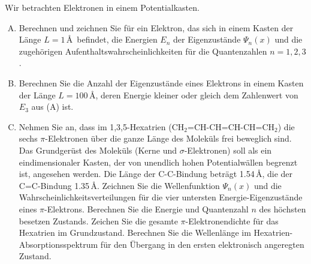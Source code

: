 \documentclass[11pt,a4paper]{article}
\begin{document}





\begin{aufg}
Wir betrachten Elektronen in einem Potentialkasten.
\begin{enumerate}[(A)]
 \item Berechnen und zeichnen Sie für ein Elektron, das sich in einem Kasten der Länge
$L=1$\,\AA\ befindet, die Energien $E_n$ der Eigenzustände $\Psi_n(x)$ und
die zugehörigen Aufenthaltswahrscheinlichkeiten für die Quantenzahlen $n=1,2,3$.
 \item Berechnen Sie die Anzahl der Eigenzustände eines Elektrons in einem Kasten der
 Länge $L=100$\,\AA, deren Energie kleiner oder gleich dem Zahlenwert von $E_3$ aus (A) ist.
 \item Nehmen Sie an, dass im 1,3,5-Hexatrien (CH$_2$=CH-CH=CH-CH=CH$_2$) die sechs
 $\pi$-Elektronen über die ganze Länge des Moleküls frei beweglich sind. Das Grundgerüst des Moleküls
 (Kerne und $\sigma$-Elektronen) soll als ein eindimensionaler Kasten, der von unendlich
 hohen Potentialwällen begrenzt ist, angesehen werden. Die Länge der C-C-Bindung
 beträgt 1.54\,\AA, die der C=C-Bindung 1.35\,\AA. Zeichnen Sie die Wellenfunktion
 $\Psi_n(x)$ und die Wahrscheinlichkeitsverteilungen für die vier untersten
 Energie-Eigenzustände eines $\pi$-Elektrons. Berechnen Sie die Energie und Quantenzahl
 $n$ des höchsten besetzen Zustands. Zeichen Sie die gesamte $\pi$-Elektronendichte
 für das Hexatrien im Grundzustand. Berechnen Sie die Wellenlänge im Hexatrien-Absorptionsspektrum
 für den Übergang in den ersten elektronisch angeregten Zustand.
\end{enumerate}
\end{aufg}



\bigskip%
\end{document}
